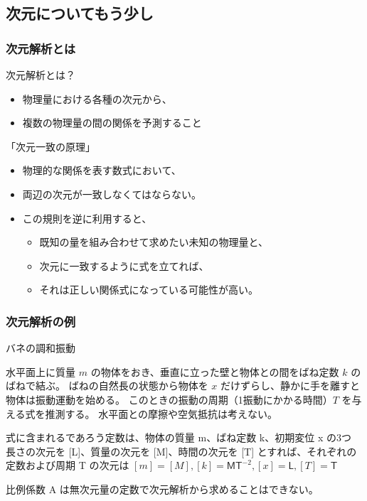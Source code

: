 \documentclass[unicode,12pt,aspectratio=169]{beamer}
\begin{document}
\subsection{次元についてもう少し}
\begin{frame}
	\frametitle{次元解析とは}
	\begin{block}{次元解析とは？}
		\begin{itemize}
			\item 物理量における各種の次元から、
			\item 複数の物理量の間の関係を予測すること
		\end{itemize}
	\end{block}
	\begin{block}{「次元一致の原理」}
		\begin{itemize}
			\item 物理的な関係を表す数式において、
			\item 両辺の次元が一致しなくてはならない。
			\item この規則を逆に利用すると、
			\begin{itemize}
				\item 既知の量を組み合わせて求めたい未知の物理量と、
				\item 次元に一致するように式を立てれば、
				\item それは正しい関係式になっている可能性が高い。
			\end{itemize} 
		\end{itemize}
	\end{block}
\end{frame}

\begin{frame}
	\frametitle{次元解析の例}
		バネの調和振動

		水平面上に質量 $m$ の物体をおき、垂直に立った壁と物体との間をばね定数 $k$ のばねで結ぶ。
		ばねの自然長の状態から物体を $x$ だけずらし、静かに手を離すと物体は振動運動を始める。
		このときの振動の周期（1振動にかかる時間）$T$ を与える式を推測する。
		水平面との摩擦や空気抵抗は考えない。

式に含まれるであろう定数は、物体の質量 m、ばね定数 k、初期変位 x の3つ
長さの次元を [L]、質量の次元を [M]、時間の次元を [T] とすれば、それぞれの定数および周期 T の次元は $[m]=[M],[k]={\mathsf{MT}}^{-2},[x]={\mathsf{L}},[T]={\mathsf{T}}$



比例係数 A は無次元量の定数で次元解析から求めることはできない。
\end{frame}
\end{document}
